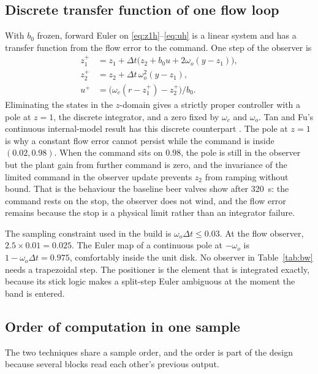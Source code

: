 \subsection{Discrete transfer function of one flow loop}

With $b_0$ frozen, forward Euler on \eqref{eq:z1h}--\eqref{eq:uh} is a linear system and has a transfer function from the flow error to the command. One step of the observer is
\begin{align}
z_1^+ &= z_1 + \Delta t\big(z_2 + b_0 u + 2\omega_o(y-z_1)\big),\\
z_2^+ &= z_2 + \Delta t\, \omega_o^2 (y-z_1),\\
u^+ &= \big(\omega_c(r-z_1^+) - z_2^+\big)/b_0.
\end{align}
Eliminating the states in the $z$-domain gives a strictly proper controller with a pole at $z=1$, the discrete integrator, and a zero fixed by $\omega_c$ and $\omega_o$. Tan and Fu's continuous internal-model result has this discrete counterpart \cite{tan2016imc}. The pole at $z=1$ is why a constant flow error cannot persist while the command is inside $(0.02,0.98)$. When the command sits on $0.98$, the pole is still in the observer but the plant gain from further command is zero, and the invariance of the limited command in the observer update prevents $z_2$ from ramping without bound. That is the behaviour the baseline beer valves show after \SI{320}{s}: the command rests on the stop, the observer does not wind, and the flow error remains because the stop is a physical limit rather than an integrator failure.

The sampling constraint used in the build is $\omega_o\Delta t \le 0.03$. At the flow observer, $2.5\times 0.01 = 0.025$. The Euler map of a continuous pole at $-\omega_o$ is $1-\omega_o\Delta t = 0.975$, comfortably inside the unit disk. No observer in Table~\ref{tab:bw} needs a trapezoidal step. The positioner is the element that is integrated exactly, because its stick logic makes a split-step Euler ambiguous at the moment the band is entered.

\subsection{Order of computation in one sample}

The two techniques share a sample order, and the order is part of the design because several blocks read each other's previous output.

